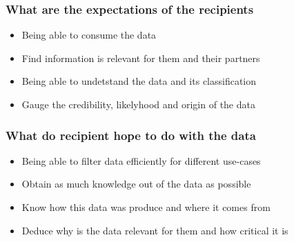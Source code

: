\begin{frame}
    \frametitle{What are the expectations of the recipients}
    \begin{itemize}
        \item Being able to consume the data
        \item Find information is relevant for them and their partners
        \item Being able to undetstand the data and its classification
        \item Gauge the credibility, likelyhood and origin of the data
    \end{itemize}

\end{frame}

\begin{frame}
    \frametitle{What do recipient hope to do with the data}
    \begin{itemize}
        \item Being able to filter data efficiently for different use-cases
        \item Obtain as much knowledge out of the data as possible
        \item Know how this data was produce and where it comes from
        \item Deduce why is the data relevant for them and how critical it is
    \end{itemize}
\end{frame}

